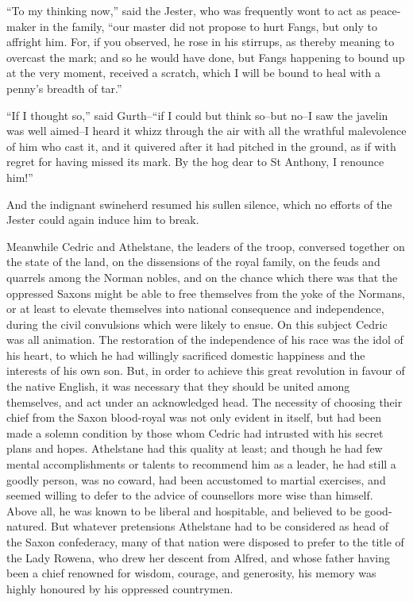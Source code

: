 ``To my thinking now,'' said the Jester, who was frequently wont to act
as peace-maker in the family, ``our master did not propose to hurt
Fangs, but only to affright him. For, if you observed, he rose in his
stirrups, as thereby meaning to overcast the mark; and so he would have
done, but Fangs happening to bound up at the very moment, received a
scratch, which I will be bound to heal with a penny's breadth of tar.''

``If I thought so,'' said Gurth--``if I could but think so--but no--I
saw the javelin was well aimed--I heard it whizz through the air with
all the wrathful malevolence of him who cast it, and it quivered after
it had pitched in the ground, as if with regret for having missed its
mark. By the hog dear to St Anthony, I renounce him!''

And the indignant swineherd resumed his sullen silence, which no efforts
of the Jester could again induce him to break.

Meanwhile Cedric and Athelstane, the leaders of the troop, conversed
together on the state of the land, on the dissensions of the royal
family, on the feuds and quarrels among the Norman nobles, and on the
chance which there was that the oppressed Saxons might be able to free
themselves from the yoke of the Normans, or at least to elevate
themselves into national consequence and independence, during the civil
convulsions which were likely to ensue. On this subject Cedric was all
animation. The restoration of the independence of his race was the idol
of his heart, to which he had willingly sacrificed domestic happiness
and the interests of his own son. But, in order to achieve this great
revolution in favour of the native English, it was necessary that they
should be united among themselves, and act under an acknowledged head.
The necessity of choosing their chief from the Saxon blood-royal was not
only evident in itself, but had been made a solemn condition by those
whom Cedric had intrusted with his secret plans and hopes. Athelstane
had this quality at least; and though he had few mental accomplishments
or talents to recommend him as a leader, he had still a goodly person,
was no coward, had been accustomed to martial exercises, and seemed
willing to defer to the advice of counsellors more wise than himself.
Above all, he was known to be liberal and hospitable, and believed to be
good-natured. But whatever pretensions Athelstane had to be considered
as head of the Saxon confederacy, many of that nation were disposed to
prefer to the title of the Lady Rowena, who drew her descent from
Alfred, and whose father having been a chief renowned for wisdom,
courage, and generosity, his memory was highly honoured by his oppressed
countrymen.

